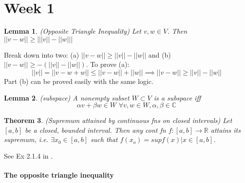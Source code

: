\documentclass{article}
\newcommand{\ie}{\textit{i.e. }}
\newtheorem{theorem}{Theorem}[section]
\newtheorem{lemma}[theorem]{Lemma}
\newcommand{\qed}{\nobreak \ifvmode \relax \else
      \ifdim\lastskip<1.5em \hskip-\lastskip
      \hskip1.5em plus0em minus0.5em \fi \nobreak
      \vrule height0.75em width0.5em depth0.25em\fi}
\newenvironment{proof}[1][Proof]{\begin{trivlist}
\item[\hskip \labelsep {\bfseries #1}]}{\end{trivlist}}
\begin{document}
\section{Week 1}
\begin{lemma} (Opposite Triangle Inequality) Let $v,w \in V$. Then $||v-w||\geq \big| ||v||-||w|| \big|$
\end{lemma}
\begin{proof}
Break down into two: (a) $||v-w||\geq ||v||-||w||$ and (b) $||v-w||\geq -(||v||-||w||)$. To prove (a):
\begin{equation}
||v|| = ||v-w+w|| \leq ||v-w||+||w|| \implies ||v-w||\geq ||v||-||w||
\end{equation}
Part (b) can be proved easily with the same logic. \qed
\end{proof}

\begin{lemma} (subspace) A nonempty subset $W \subset V$ is a subspace iff
\begin{equation}
\alpha v+ \beta w \in W\,\, \forall v,w \in W, \alpha, \beta \in \mathbb{C}
\end{equation}
\end{lemma}

\begin{theorem}
(Supremum attained by continuous fns on closed intervals)
Let $[a,b]$ be a closed, bounded interval. Then any cont fn $f:[a,b]\rightarrow \mathbb{R}$ attains its supremum, \ie $\exists x_0 \in [a,b]$ such that $f(x_o) = sup{f(x) | x \in [a,b]}$.
\end{theorem}
\begin{proof}
See Ex 2.1.4 in \cite{christensen10}.
\end{proof}

\paragraph{The opposite triangle inequality}






\end{document}
